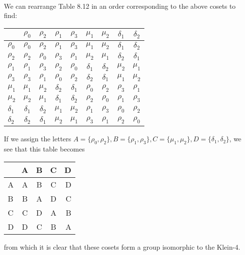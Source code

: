 \documentclass[11pt]{hmcpset}
\newenvironment{problem1}[1]{\noindent {\bf Problem #1:}}
{\medskip}
\begin{document}
\begin{problem1}{11}\\
We can rearrange Table 8.12 in an order corresponding to the above cosets to find:
\begin{center}
  \begin{tabular}{  l || c|c || c|c || c|c || c|c }
     &$ \rho_0 $&$ \rho_2 $&$ \rho_1 $&$ \rho_3 $&$ \mu_1 $&$ \mu_2 $&$ \delta_1 $&$ \delta_2$\\ \hline\hline
    $\rho_0$ &$ \rho_0 $&$ \rho_2 $&$ \rho_1 $&$ \rho_3 $&$ \mu_1 $&$ \mu_2 $&$ \delta_1 $&$ \delta_2$\\
    \hline
     $\rho_2$ &$ \rho_2 $&$ \rho_0 $&$ \rho_3 $&$ \rho_1 $&$ \mu_2 $&$ \mu_1 $&$ \delta_2 $&$ \delta_1$\\
      \hline\hline
     $\rho_1$ & $\rho_1$ & $ \rho_3$ & $\rho_2$ & $\rho_0$ & $\delta_1$ & $\delta_2$ & $\mu_2$ & $\mu_1$\\
     \hline
      $\rho_3$ & $\rho_3$ & $ \rho_1$ & $\rho_0$ & $\rho_2$ & $\delta_2$ & $\delta_1$ & $\mu_1$ & $\mu_2$\\
      \hline\hline
      $\mu_1$ & $\mu_1$ & $\mu_2$ & $\delta_2$ & $\delta_1$ & $\rho_0$ & $\rho_2$ & $\rho_3$ & $\rho_1$\\
      \hline
        $\mu_2$ & $\mu_2$ & $\mu_1$ & $\delta_1$ & $\delta_2$ & $\rho_2$ & $\rho_0$ & $\rho_1$ & $\rho_3$\\
        \hline\hline
        $\delta_1$ & $\delta_1$ & $\delta_2$ & $\mu_1$ & $\mu_2$ & $\rho_1$ & $\rho_3$ & $\rho_0$ & $\rho_2$\\
        \hline
        $\delta_2$ & $\delta_2$ & $\delta_1$ & $\mu_2$ & $\mu_1$ & $\rho_3$ & $\rho_1$ & $\rho_2$ & $\rho_0$\\


  \end{tabular}
\end{center}
\vspace{.45cm}
If we assign the letters $A=\{\rho_0,\rho_2\}, B=\{\rho_1,\rho_3\}, C=\{\mu_1, \mu_2\}, D=\{\delta_1,\delta_2\}$, we see that this table becomes

\begin{center}
\begin{tabular}{ l | c  c   c  r }
& A & B & C & D\\\hline
A & A & B & C & D \\
B & B & A & D & C \\
C & C & D & A & B \\
D & D & C & B & A \\

\end{tabular}
\end{center}
from which it is clear that these cosets form a group isomorphic to the Klein-4.\\

\end{problem1}
\end{document}
